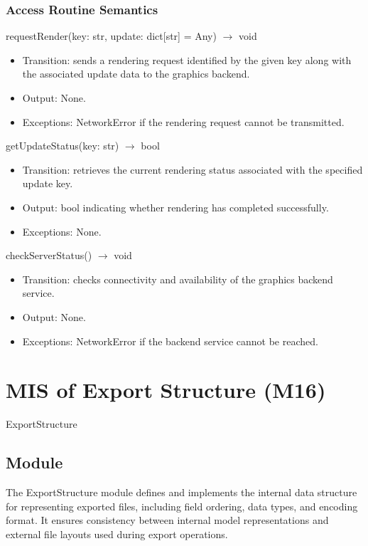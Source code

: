 \documentclass[12pt, titlepage]{article}
\begin{document}
\subsubsection{Access Routine Semantics}

requestRender(key: str, update: dict[str] = Any) $\rightarrow$ void
\begin{itemize}
  \item Transition: sends a rendering request identified by the given key along with the associated update data to the graphics backend.
  \item Output: None.
  \item Exceptions: NetworkError if the rendering request cannot be transmitted.
\end{itemize}

getUpdateStatus(key: str) $\rightarrow$ bool
\begin{itemize}
  \item Transition: retrieves the current rendering status associated with the specified update key.
  \item Output: bool indicating whether rendering has completed successfully.
  \item Exceptions: None.
\end{itemize}

checkServerStatus() $\rightarrow$ void
\begin{itemize}
  \item Transition: checks connectivity and availability of the graphics backend service.
  \item Output: None.
  \item Exceptions: NetworkError if the backend service cannot be reached.
\end{itemize}

\newpage

\section{MIS of Export Structure (M16)}\label{Module20}

ExportStructure

\subsection{Module}
The ExportStructure module defines and implements the internal data structure for representing exported files, including field ordering, data types, and encoding format. It ensures consistency between internal model representations and external file layouts used during export operations.
\end{document}
